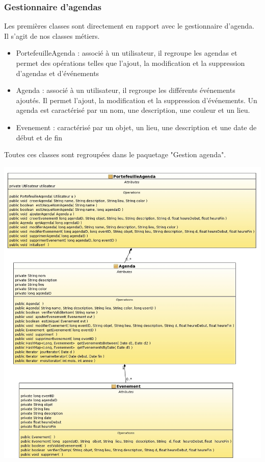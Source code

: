 \documentclass[12pt , a4paper]{article}
\begin{document}
\subsubsection{Gestionnaire d'agendas}
\noindent Les premières classes sont directement en rapport avec le gestionnaire d'agenda. Il s'agit de nos classes métiers.
\begin{itemize}
\item PortefeuilleAgenda : associé à un utilisateur, il regroupe les agendas et permet des opérations telles que l'ajout, la modification et la suppression d'agendas et d'événements
\item Agenda : associé  à un utilisateur, il regroupe les différents  événements ajoutés. Il permet l'ajout, la modification  et la suppression d'événements. Un agenda est caractérisé  par un nom, une
  description, une couleur et un lieu.
\item Evenement : caractérisé par un objet, un lieu, une description et une date de début et de fin
\end{itemize}
\noindent Toutes ces classes sont regroupées dans le paquetage "Gestion agenda".
\begin{center}
  \includegraphics[scale=0.45]{./images/class_diagram_gestionagenda.jpg}
\end{center}
\end{document}
